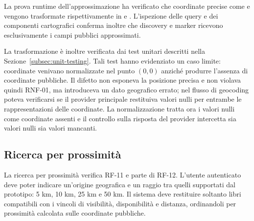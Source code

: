 La prova runtime dell'approssimazione ha verificato che coordinate precise come  e  vengono trasformate rispettivamente in  e . L'ispezione delle query e dei componenti cartografici conferma inoltre che discovery e marker ricevono esclusivamente i campi pubblici approssimati.

La trasformazione è inoltre verificata dai test unitari descritti nella Sezione~\ref{subsec:unit-testing}. Tali test hanno evidenziato un caso limite: coordinate  venivano normalizzate nel punto $(0, 0)$ anziché produrre l'assenza di coordinate pubbliche. Il difetto non esponeva la posizione precisa e non violava quindi RNF-01, ma introduceva un dato geografico errato; nel flusso di geocoding poteva verificarsi se il provider principale restituiva valori nulli per entrambe le rappresentazioni delle coordinate. La normalizzazione tratta ora i valori nulli come coordinate assenti e il controllo sulla risposta del provider intercetta sia valori nulli sia valori mancanti.


\subsection{Ricerca per prossimità}
\label{subsec:test-nearby}

La ricerca per prossimità verifica RF-11 e parte di RF-12. L'utente autenticato deve poter indicare un'origine geografica e un raggio tra quelli supportati dal prototipo: 5 km, 10 km, 25 km e 50 km. Il sistema deve restituire soltanto libri compatibili con i vincoli di visibilità, disponibilità e distanza, ordinandoli per prossimità calcolata sulle coordinate pubbliche.

